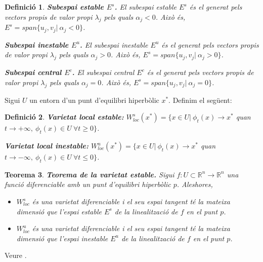 \documentclass[11pt,a4paper,openright,oneside]{article}
\numberwithin{equation}{section}
\newtheorem{teo}{Teorema}[section]
\newtheorem{defi}[teo]{Definici\'o}
\theoremstyle{definition}
\begin{document}
\begin{defi}
    \textbf{Subespai estable $E^{s}$.} El subespai estable $E^s$ és el generat pels vectors propis de valor propi $\lambda_j$ pels quals $\alpha_j<0$. Això és, $E^s=span\{u_j,v_j|\ \alpha_j<0\}$.
    
    \textbf{Subespai inestable $E^{u}$.} El subespai inestable $E^u$ és el generat pels vectors propis de valor propi $\lambda_j$ pels quals $\alpha_j>0$. Això és, $E^s=span\{u_j,v_j|\ \alpha_j>0\}$.
    
    \textbf{Subespai central $E^{c}$.} El subespai central $E^c$ és el generat pels vectors propis de valor propi $\lambda_j$ pels quals $\alpha_j=0$. Això és, $E^s=span\{u_j,v_j|\ \alpha_j=0\}$.
\end{defi}

Sigui $U$ un entorn d'un punt d'equilibri hiperbòlic $x^{*}$. Definim el següent:

\begin{defi}
    \textbf{Varietat local estable:} $W_{loc}^s\left(x^*\right)=\{x\in U | \  \phi_t(x)\rightarrow{x}^{*}$ quan $t\rightarrow{+\infty}, \ \phi_t(x)\in U \ \forall t \geq0\}$.

    \textbf{Varietat local inestable:} $W_{loc}^u(x^*)=\{x\in U | \ \phi_t(x)\rightarrow{x}^{*}$ quan $t\rightarrow{-\infty}, \ \phi_t(x)\in U \ \forall t \le0\}$.
\end{defi}

\begin{teo} \label{teo:varietat_estable}
    \textbf{Teorema de la varietat estable.} 
        Sigui $f:U\subset \mathbb{R}^n\rightarrow{\mathbb{R}^n}$ una funció diferenciable amb un punt d'equilibri hiperbòlic $p$. Aleshores,
        \begin{itemize}
        
        \item $W_{loc}^s$ és una varietat diferenciable i el seu espai tangent té la mateixa dimensió que l'espai estable $E^s$ de la linealització de $f$ en el punt $p$.

        \item $W_{loc}^u$ és una varietat diferenciable i el seu espai tangent té la mateixa dimensió que l'espai inestable $E^u$ de la linealització de $f$ en el punt $p$.
    \end{itemize}
\end{teo}

\proof Veure \cite{manifolds}.
\end{document}
